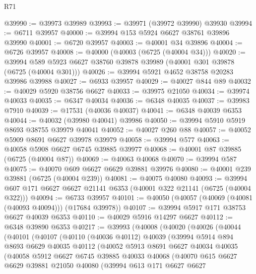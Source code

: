 \begin{lexlean}{R71}
\begin{coremodule}
@39990 := @39973 @39989
@39993 := @39971 (@39972 @39990) @39930
@39994 := @6711 @39957
@40000 := @39994 @153 @5924 @6627 @38761 @39896 @39990
@40001 := @6720 @39957
@40003 := @40001 @34 @39896
@40004 := @6726 @39957
@40008 := @40000 (@40003 (@6725 (@40004 @34)))
@40020 := @39994 @589 @5923 @6627 @38760 @39878 @39989 (@40001 @301 @39878 (@6725 (@40004 @301)))
@40026 := @39994 @5921 @4652 @38758 @20283 @39986 @39988
@40027 := @6933 @39957
@40029 := @40027 @844 @89
@40032 := @40029 @5920 @38756 @6627
@40033 := @39975 @21050
@40034 := @39974 @40033
@40035 := @6347 @40034
@40036 := @6348 @40035
@40037 := @39983 @7910
@40039 := @17531 (@40036 @40037)
@40041 := @6348 @40039 @6353
@40044 := @40032 (@39980 @40041) @39986
@40050 := @39994 @5910 @5919 @8693 @38755 @39979 @40041
@40052 := @40027 @260 @88
@40057 := @40052 @5909 @8691 @6627 @39978 @39979
@40058 := @39994 @577
@40063 := @40058 @5908 @6627 @6745 @39885 @39977
@40068 := @40001 @87 @39885 (@6725 (@40004 @87))
@40069 := @40063 @40068
@40070 := @39994 @587
@40075 := @40070 @609 @6627 @6629 @39881 @39976
@40080 := @40001 @239 @39881 (@6725 (@40004 @239))
@40081 := @40075 @40080
@40093 := @39994 @607 @171 @6627 @6627 @21141 @6353 (@40001 @322 @21141 (@6725 (@40004 @322)))
@40094 := @6733 @39957
@40101 := @40050 (@40057 (@40069 (@40081 (@40093 @40094))) (@17684 @39978))
@40107 := @39994 @5917 @171 @38753 @6627 @40039 @6353
@40110 := @40029 @5916 @14297 @6627
@40112 := @6348 @39890 @6353
@40217 := @39993
    (@40008
      (@40020
        (@40026
          (@40044
            (@40101
              (@40107
                (@40110
                  (@40036 @40112)
                  @40039
                  (@39994
                    @5914
                    @894
                    @8693
                    @6629
                    @40035
                    @40112
                    (@40052
                      @5913
                      @8691
                      @6627
                      @40034
                      @40035
                      (@40058
                        @5912
                        @6627
                        @6745
                        @39885
                        @40033
                        @40068
                        (@40070
                          @615
                          @6627
                          @6629
                          @39881
                          @21050
                          @40080
                          (@39994
                            @613
                            @171
                            @6627
                            @6627

\end{coremodule}
\end{lexlean}
